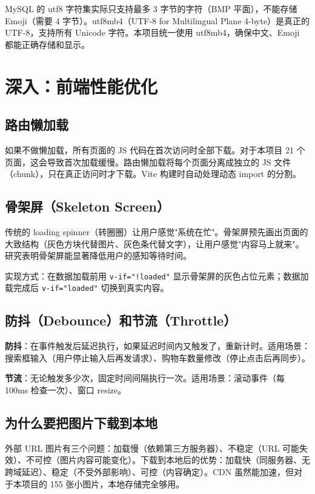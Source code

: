 \documentclass[12pt,a4paper]{ctexart}
\begin{document}
MySQL 的 utf8 字符集实际只支持最多 3 字节的字符（BMP 平面），不能存储 Emoji（需要 4 字节）。utf8mb4（UTF-8 for Multilingual Plane 4-byte）是真正的 UTF-8，支持所有 Unicode 字符。本项目统一使用 utf8mb4，确保中文、Emoji 都能正确存储和显示。

\section{深入：前端性能优化}

\subsection{路由懒加载}

如果不做懒加载，所有页面的 JS 代码在首次访问时全部下载。对于本项目 21 个页面，这会导致首次加载缓慢。路由懒加载将每个页面分离成独立的 JS 文件（chunk），只在真正访问时才下载。Vite 构建时自动处理动态 import 的分割。

\subsection{骨架屏（Skeleton Screen）}

传统的 loading spinner（转圈圈）让用户感觉"系统在忙"。骨架屏预先画出页面的大致结构（灰色方块代替图片、灰色条代替文字），让用户感觉"内容马上就来"。研究表明骨架屏能显著降低用户的感知等待时间。

实现方式：在数据加载前用 \texttt{v-if="!loaded"} 显示骨架屏的灰色占位元素；数据加载完成后 \texttt{v-if="loaded"} 切换到真实内容。

\subsection{防抖（Debounce）和节流（Throttle）}

\textbf{防抖}：在事件触发后延迟执行，如果延迟时间内又触发了，重新计时。适用场景：搜索框输入（用户停止输入后再发请求）、购物车数量修改（停止点击后再同步）。

\textbf{节流}：无论触发多少次，固定时间间隔执行一次。适用场景：滚动事件（每 100ms 检查一次）、窗口 resize。

\subsection{为什么要把图片下载到本地}

外部 URL 图片有三个问题：加载慢（依赖第三方服务器）、不稳定（URL 可能失效）、不可控（图片内容可能变化）。下载到本地后的优势：加载快（同服务器、无跨域延迟）、稳定（不受外部影响）、可控（内容确定）。CDN 虽然能加速，但对于本项目的 155 张小图片，本地存储完全够用。
\end{document}
